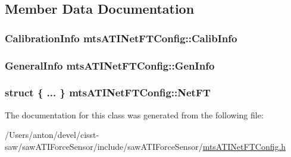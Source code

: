 \subsection{Member Data Documentation}
\hypertarget{classmts_a_t_i_net_f_t_config_a8a79d092fb24d610b055aca16680e749}{}
\subsubsection[{Calib\+Info}]{\setlength{\rightskip}{0pt plus 5cm}Calibration\+Info mts\+A\+T\+I\+Net\+F\+T\+Config\+::\+Calib\+Info}\label{classmts_a_t_i_net_f_t_config_a8a79d092fb24d610b055aca16680e749}
\hypertarget{classmts_a_t_i_net_f_t_config_a683259eee30c2156fe2e46bb34caa4eb}{}
\subsubsection[{Gen\+Info}]{\setlength{\rightskip}{0pt plus 5cm}General\+Info mts\+A\+T\+I\+Net\+F\+T\+Config\+::\+Gen\+Info}\label{classmts_a_t_i_net_f_t_config_a683259eee30c2156fe2e46bb34caa4eb}
\hypertarget{classmts_a_t_i_net_f_t_config_a728e56c02c4ba7f270035158419062df}{}
\subsubsection[{Net\+F\+T}]{\setlength{\rightskip}{0pt plus 5cm}struct \{ ... \}   mts\+A\+T\+I\+Net\+F\+T\+Config\+::\+Net\+F\+T}\label{classmts_a_t_i_net_f_t_config_a728e56c02c4ba7f270035158419062df}


The documentation for this class was generated from the following file\+:\begin{DoxyCompactItemize}
\item 
/\+Users/anton/devel/cisst-\/saw/saw\+A\+T\+I\+Force\+Sensor/include/saw\+A\+T\+I\+Force\+Sensor/\hyperlink{mts_a_t_i_net_f_t_config_8h}{mts\+A\+T\+I\+Net\+F\+T\+Config.\+h}\end{DoxyCompactItemize}
